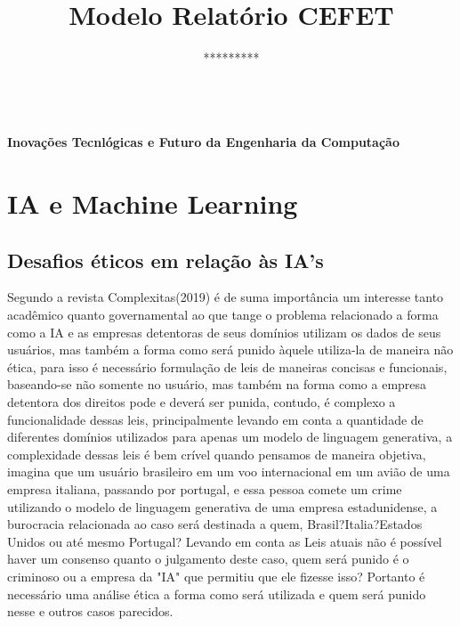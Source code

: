 \documentclass[12pt,a4paper]{article}
\author{*********} %
\makeatletter
\newcommand{\CEFETtitulo}[1]{
\begin{center}
\begin{Large}
\textbf{\\#1\\}
\end{Large}
\vspace{.5cm}
{\large \textbf{\@author}} %
\end{center}
\vspace{.5cm}
}
\newcommand{\CEFETopen}{
    \selectlanguage{brazilian}
    \pagestyle{otherpage}
    \thispagestyle{firstpage}
}
\makeatother
\begin{document}
    \title{Modelo Relatório CEFET} %
    \CEFETopen
    \CEFETtitulo{Inovações Tecnlógicas e Futuro da Engenharia da Computação}


    \section{IA e Machine Learning}


    \subsection{Desafios éticos em relação às IA's}

    Segundo a revista Complexitas(2019)\citet{complexitas6633} é de suma importância um interesse tanto acadêmico quanto governamental ao que tange o 
    problema relacionado a forma como a IA e as empresas detentoras de seus domínios utilizam os dados de seus usuários, mas também a forma como será 
    punido àquele utiliza-la de maneira não ética, para isso é necessário formulação de leis de maneiras concisas e funcionais, baseando-se não somente no
    usuário, mas também na forma como a empresa detentora dos direitos pode e deverá ser punida, contudo, é complexo a funcionalidade dessas leis,
    principalmente levando em conta a quantidade de diferentes domínios utilizados para apenas um modelo de linguagem generativa, a complexidade dessas leis
    é bem crível quando pensamos de maneira objetiva, imagina que um usuário brasileiro em um voo internacional em um avião de uma empresa italiana, 
    passando por portugal, e essa pessoa comete um crime utilizando o modelo de linguagem generativa de uma empresa estadunidense, a burocracia relacionada
    ao caso será destinada a quem, Brasil?Italia?Estados Unidos ou até mesmo Portugal? Levando em conta as Leis atuais não é possível haver um consenso
    quanto o julgamento deste caso, quem será punido é o criminoso ou a empresa da "IA" que permitiu que ele fizesse isso? Portanto é necessário uma análise
    ética a forma como será utilizada e quem será punido nesse e outros casos parecidos.







\clearpage


\end{document}
